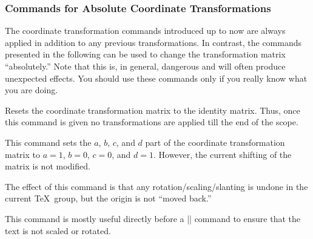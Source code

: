 \subsubsection{Commands for Absolute Coordinate Transformations}

The coordinate transformation commands introduced up to now are always
applied in addition to any previous transformations. In contrast, the
commands presented in the following can be used to change the
transformation matrix ``absolutely.'' Note that this is, in general,
dangerous and will often produce unexpected effects. You should use
these commands only if you really know what you are doing.

\begin{command}{\pgftransformreset}
  Resets the coordinate transformation matrix to the identity
  matrix. Thus, once this command is given no transformations are
  applied till the end of the scope.
\begin{codeexample}[]
\end{codeexample}
\end{command}


\begin{command}{\pgftransformresetnontranslations}
  This command sets the $a$, $b$, $c$, and $d$ part of the coordinate
  transformation matrix to $a=1$, $b=0$, $c=0$, and $d=1$. However,
  the current shifting of the matrix is not modified.

  The effect of this command is that any rotation/scaling/slanting is
  undone in the current \TeX\ group, but the origin is not ``moved
  back.''

  This command is mostly useful directly before a |\pgftext| command
  to ensure that the text is not scaled or rotated.
\begin{codeexample}[]
\end{codeexample}
\end{command}


